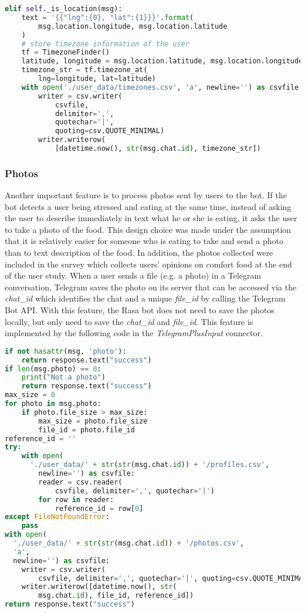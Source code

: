 \begin{lstlisting}[language=Python]
elif self._is_location(msg):
    text = '{{"lng":{0}, "lat":{1}}}'.format(
        msg.location.longitude, msg.location.latitude
    )
    # store timezone information of the user
    tf = TimezoneFinder()
    latitude, longitude = msg.location.latitude, msg.location.longitude
    timezone_str = tf.timezone_at(
        lng=longitude, lat=latitude)
    with open('./user_data/timezones.csv', 'a', newline='') as csvfile:
        writer = csv.writer(
            csvfile,
            delimiter=',',
            quotechar='|',
            quoting=csv.QUOTE_MINIMAL)
        writer.writerow(
            [datetime.now(), str(msg.chat.id), timezone_str])
\end{lstlisting}

\subsubsection{Photos}
Another important feature is to process photos sent by users to the bot. If the bot detects a user being stressed and eating at the same time, instead of asking the user to describe immediately in text what he or she is eating, it asks the user to take a photo of the food. This design choice was made under the assumption that it is relatively easier for someone who is eating to take and send a photo than to text description of the food. In addition, the photos collected were included in the survey which collects users' opinions on comfort food at the end of the user study. When a user sends a file (e.g. a photo) in a Telegram conversation, Telegram saves the photo on its server that can be accessed via the \emph{chat\_id} which identifies the chat and a unique \emph{file\_id} by calling the Telegram Bot API. With this feature, the Rasa bot does not need to save the photos locally, but only need to save the \emph{chat\_id} and \emph{file\_id}. This feature is implemented by the following code in the \emph{TelegramPlusInput} connector. \bigskip

\begin{lstlisting}[language=Python]
if not hasattr(msg, 'photo'):
    return response.text("success")
if len(msg.photo) == 0:
    print("Not a photo")
    return response.text("success")
max_size = 0
for photo in msg.photo:
    if photo.file_size > max_size:
        max_size = photo.file_size
        file_id = photo.file_id
reference_id = ''
try:
    with open(
      './user_data/' + str(str(msg.chat.id)) + '/profiles.csv',
        newline='') as csvfile:
        reader = csv.reader(
            csvfile, delimiter=',', quotechar='|')
        for row in reader:
            reference_id = row[0]
except FileNotFoundError:
    pass
with open(
  './user_data/' + str(str(msg.chat.id)) + '/photos.csv',
  'a',
  newline='') as csvfile:
    writer = csv.writer(
        csvfile, delimiter=',', quotechar='|', quoting=csv.QUOTE_MINIMAL)
    writer.writerow([datetime.now(), str(
        msg.chat.id), file_id, reference_id])
return response.text("success")
\end{lstlisting}

